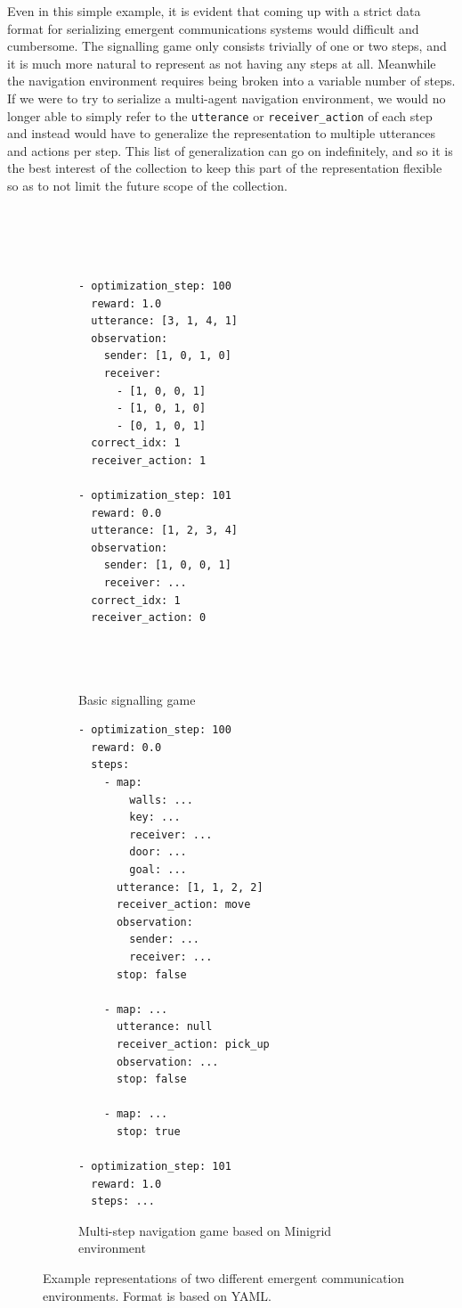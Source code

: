 Even in this simple example, it is evident that coming up with a strict data format for serializing emergent communications systems would difficult and cumbersome.
The signalling game only consists trivially of one or two steps, and it is much more natural to represent as not having any steps at all.
Meanwhile the navigation environment requires being broken into a variable number of steps.
If we were to try to serialize a multi-agent navigation environment, we would no longer able to simply refer to the {\small\texttt{utterance}} or {\small\texttt{receiver\_action}} of each step and instead would have to generalize the representation to multiple utterances and actions per step.
This list of generalization can go on indefinitely, and so it is the best interest of the collection to keep this part of the representation flexible so as to not limit the future scope of the collection.


\begin{figure}
  \centering
  \begin{subfigure}[t]{0.4\linewidth}
    \centering
    \footnotesize
\begin{verbatim}




- optimization_step: 100
  reward: 1.0
  utterance: [3, 1, 4, 1]
  observation:
    sender: [1, 0, 1, 0]
    receiver:
      - [1, 0, 0, 1]
      - [1, 0, 1, 0]
      - [0, 1, 0, 1]
  correct_idx: 1
  receiver_action: 1

- optimization_step: 101
  reward: 0.0
  utterance: [1, 2, 3, 4]
  observation:
    sender: [1, 0, 0, 1]
    receiver: ...
  correct_idx: 1
  receiver_action: 0




\end{verbatim}
    \caption{Basic signalling game}
  \end{subfigure}
  \hfill
  \begin{subfigure}[t]{0.4\linewidth}
    \centering
    \footnotesize
\begin{verbatim}
- optimization_step: 100
  reward: 0.0
  steps:
    - map:
        walls: ...
        key: ...
        receiver: ...
        door: ...
        goal: ...
      utterance: [1, 1, 2, 2]
      receiver_action: move
      observation:
        sender: ...
        receiver: ...
      stop: false

    - map: ...
      utterance: null
      receiver_action: pick_up
      observation: ...
      stop: false

    - map: ...
      stop: true

- optimization_step: 101
  reward: 1.0
  steps: ...
\end{verbatim}
    \caption{Multi-step navigation game based on Minigrid environment}
  \end{subfigure}
  \caption{Example representations of two different emergent communication environments.  Format is based on YAML\@.}
  \unskip\label{fig:serialization}
\end{figure}


